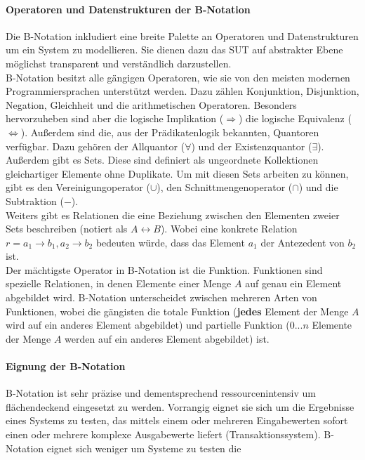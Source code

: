 \paragraph{Operatoren und Datenstrukturen der B-Notation}
Die B-Notation inkludiert eine breite Palette an Operatoren und Datenstrukturen um ein System zu modellieren. Sie dienen dazu das \gls{SUT} auf abstrakter Ebene möglichst transparent und verständlich darzustellen.\\
B-Notation besitzt alle gängigen Operatoren, wie sie von den meisten modernen Programmiersprachen unterstützt werden. Dazu zählen Konjunktion, Disjunktion, Negation, Gleichheit und die arithmetischen Operatoren. Besonders hervorzuheben sind aber die logische Implikation ($\Rightarrow$) die logische Equivalenz ($\Leftrightarrow$). Außerdem sind die, aus der Prädikatenlogik bekannten, Quantoren verfügbar\cite{teschl_mathematik_2013}. Dazu gehören der Allquantor ($\forall$) und der Existenzquantor ($\exists$).\\
Außerdem gibt es Sets. Diese sind definiert als ungeordnete Kollektionen gleichartiger Elemente ohne Duplikate. Um mit diesen Sets arbeiten zu können, gibt es den Vereinigungoperator ($\cup$), den Schnittmengenoperator ($\cap$) und die Subtraktion ($-$).\\
Weiters gibt es Relationen die eine Beziehung zwischen den Elementen zweier Sets beschreiben (notiert als $A \leftrightarrow B$). Wobei eine konkrete Relation $r = {a_1 \rightarrow b_1, a_2 \rightarrow b_2} $ bedeuten würde, dass das Element $a_1$ der Antezedent von $b_2$ ist.\\
Der mächtigste Operator in B-Notation ist die Funktion. Funktionen sind spezielle Relationen, in denen Elemente einer Menge $A$ auf genau ein Element abgebildet wird. B-Notation unterscheidet zwischen mehreren Arten von Funktionen, wobei die gängisten die totale Funktion (\textbf{jedes} Element der Menge $A$ wird auf ein anderes Element abgebildet) und partielle Funktion ($0...n$ Elemente der Menge $A$ werden auf ein anderes Element abgebildet) ist. 

\paragraph{Eignung der B-Notation}
B-Notation ist sehr präzise und dementsprechend ressourcenintensiv um flächendeckend eingesetzt zu werden. Vorrangig eignet sie sich um die Ergebnisse eines Systems zu testen, das mittels einem oder mehreren Eingabewerten sofort einen oder mehrere komplexe Ausgabewerte liefert (Transaktionssystem). B-Notation eignet sich weniger um Systeme zu testen die 

